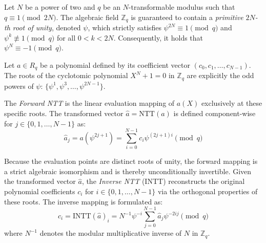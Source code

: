 \newpage
\begin{definition}
    Let $N$ be a power of two and $q$ be an $N$-transformable modulus such that $q \equiv 1 \pmod{2N}$. The algebraic field $\mathbb{Z}_q$ is guaranteed to contain a \emph{primitive $2N$-th root of unity}, denoted $\psi$, which strictly satisfies $\psi^{2N} \equiv 1 \pmod q$ and $\psi^k \not\equiv 1 \pmod q$ for all $0 < k < 2N$. Consequently, it holds that $\psi^N \equiv -1 \pmod q$.
\end{definition}

\begin{definition}
    Let $a \in R_q$ be a polynomial defined by its coefficient vector $(c_0, c_1, \dots, c_{N-1})$. The roots of the cyclotomic polynomial $X^N+1 = 0$ in $\mathbb{Z}_q$ are explicitly the odd powers of $\psi$: $\{\psi^1, \psi^3, \dots, \psi^{2N-1}\}$. 
    
    The \emph{Forward NTT} is the linear evaluation mapping of $a(X)$ exclusively at these specific roots. The transformed vector $\hat{a} = \text{NTT}(a)$ is defined component-wise for $j \in \{0, 1, \dots, N-1\}$ as:
    \begin{equation}
        \label{eq:forward-ntt}
        \hat{a}_j = a(\psi^{2j+1}) = \sum_{i=0}^{N-1} c_i \psi^{(2j+1)i} \pmod q
    \end{equation}
\end{definition}

\begin{definition}
    Because the evaluation points are distinct roots of unity, the forward mapping is a strict algebraic isomorphism and is thereby unconditionally invertible. Given the transformed vector $\hat{a}$, the \emph{Inverse NTT} (INTT) reconstructs the original polynomial coefficients $c_i$ for $i \in \{0, 1, \dots, N-1\}$ via the orthogonal properties of these roots. The inverse mapping is formulated as:
    \begin{equation}
        \label{eq:inverse-ntt}
        c_i = \text{INTT}(\hat{a})_i = N^{-1} \psi^{-i} \sum_{j=0}^{N-1} \hat{a}_j \psi^{-2ij} \pmod q
    \end{equation}
    where $N^{-1}$ denotes the modular multiplicative inverse of $N$ in $\mathbb{Z}_q$.
\end{definition}

